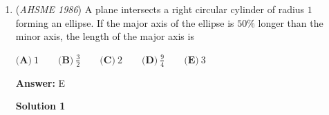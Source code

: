 \begin{enumerate}
 -j314andrews

 



\textbf{Solution 4}

Let $w$, $x$, $y$, and $z$ be the number of red, green, blue, and black socks selected, respectively.  Then the number of matched pairs of socks is $\left\lfloor \frac{w}{2} \right\rfloor + \left\lfloor \frac{x}{2} \right\rfloor + \left\lfloor \frac{y}{2} \right\rfloor + \left\lfloor \frac{z}{2} \right\rfloor$.  Note that for any integer $n$, $\left\lfloor \frac{n}{2} \right\rfloor = \frac{n}{2}$ if $n$ is even and $\left\lfloor \frac{n}{2} \right\rfloor = \frac{n-1}{2}$ if $n$ is odd.  So $\left\lfloor \frac{w}{2} \right\rfloor + \left\lfloor \frac{x}{2} \right\rfloor + \left\lfloor \frac{y}{2} \right\rfloor + \left\lfloor \frac{z}{2} \right\rfloor \geq \frac{w-1}{2} + \frac{x-1}{2} + \frac{y-1}{2} + \frac{z-1}{2} = \frac{w+x+y+z}{2} - 2$.  Thus if $\left\lfloor \frac{w}{2} \right\rfloor + \left\lfloor \frac{x}{2} \right\rfloor + \left\lfloor \frac{y}{2} \right\rfloor + \left\lfloor \frac{z}{2} \right\rfloor \leq 9$, then $\frac{w+x+y+z}{2} - 2 \leq 9$ and $w+x+y+z \leq 22$.  That is, a set of socks containing $9$ or fewer matched pairs contains at most $22$ socks.  Several equality cases exist, such as $(w, x, y, z) = (19, 1, 1, 1)$.  So the minimum number of socks needed to guarantee $10$ matched pairs is $22 + 1 = \boxed{\textbf{(B) } 23}$.

 -j314andrews

 



\textbf{Solution 5}

You want to maximize the amount of odd numbers of socks you get. One way you can do this is $1,1,1,21$ socks to give you 10 pairs. However, you would not be able to get the last sock, giving you $1+1+1+20=23$ socks.-megacleverstarfish15

 


	\item (\textit{AHSME 1986}) A plane intersects a right circular cylinder of radius $1$ forming an ellipse. 
If the major axis of the ellipse is $50\%$ longer than the minor axis, the length of the major axis is


 $\textbf{(A)}\ 1\qquad \textbf{(B)}\ \frac{3}{2}\qquad \textbf{(C)}\ 2\qquad \textbf{(D)}\ \frac{9}{4}\qquad \textbf{(E)}\ 3$

 \textbf{Answer: }E



\textbf{Solution 1}


\end{enumerate}
